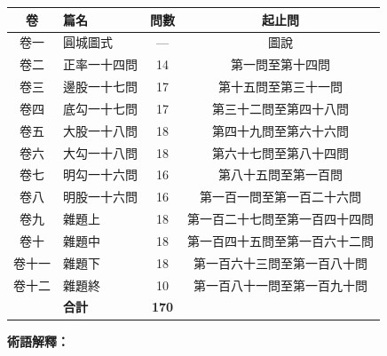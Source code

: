 \documentclass[11pt,a4paper]{article}
\begin{document}
\vspace{0.3cm}
\begin{center}
\begin{tabular}{clcc}
\toprule
\textbf{卷} & \textbf{篇名} & \textbf{問數} & \textbf{起止問} \\
\midrule
卷一 & 圓城圖式 & --- & 圖說 \\
卷二 & 正率一十四問 & 14 & 第一問至第十四問 \\
卷三 & 邊股一十七問 & 17 & 第十五問至第三十一問 \\
\rowcolor{gray!15}
卷四 & 底勾一十七問 & 17 & 第三十二問至第四十八問 \\
\rowcolor{gray!15}
卷五 & 大股一十八問 & 18 & 第四十九問至第六十六問 \\
\rowcolor{gray!15}
卷六 & 大勾一十八問 & 18 & 第六十七問至第八十四問 \\
卷七 & 明勾一十六問 & 16 & 第八十五問至第一百問 \\
卷八 & 明股一十六問 & 16 & 第一百一問至第一百二十六問 \\
卷九 & 雜題上 & 18 & 第一百二十七問至第一百四十四問 \\
卷十 & 雜題中 & 18 & 第一百四十五問至第一百六十二問 \\
卷十一 & 雜題下 & 18 & 第一百六十三問至第一百八十問 \\
卷十二 & 雜題終 & 10 & 第一百八十一問至第一百九十問 \\
\midrule
 & \textbf{合計} & \textbf{170} & \\
\bottomrule
\end{tabular}
\end{center}

\vspace{0.5cm}
\noindent\textbf{術語解釋：}
\end{document}
